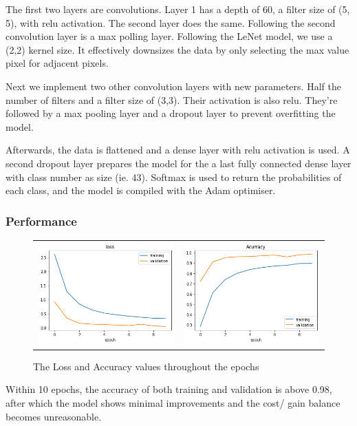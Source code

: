 \documentclass[12pt, landscape]{article}
\begin{document}
\begin{multicols}{3}
The first two layers are convolutions. Layer 1 has a depth of 60, a filter size
of (5, 5), with relu activation. The second layer does the same. Following the
second convolution layer is a max polling layer. Following the LeNet model, we
use a (2,2) kernel size. It effectively downsizes the data by only selecting the
max value pixel for adjacent pixels.

Next we implement two other convolution layers with new parameters. Half the
number of filters and a filter size of (3,3). Their activation is also relu.
They're followed by a max pooling layer and a dropout layer to prevent
overfitting the model. 

Afterwards, the data is flattened and a dense layer with relu activation is
used. A second dropout layer prepares the model for the a last fully connected
dense layer with class number as size (ie. 43). Softmax is used to return the
probabilities of each class, and the model is compiled with the Adam optimiser.

\subsubsection{Performance}
\begin{figure}[H]
    \centering
    \begin{tabular}{cc}
    \includegraphics[scale=0.45]{accuracy1.png}&
    \includegraphics[scale=0.45]{accuracy2.png}\\
    \end{tabular}
    \caption{The Loss and Accuracy values throughout the epochs}
    \label{fig:acc}
\end{figure}
Within 10 epochs, the accuracy of both training and validation is above 0.98,
after which the model shows minimal improvements and the cost/ gain balance
becomes unreasonable.


\end{multicols}
\end{document}
